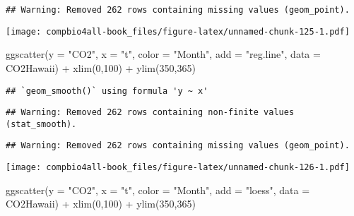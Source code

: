 \documentclass[
]{book}
\newenvironment{Shaded}{\begin{snugshade}}{\end{snugshade}}
\newcommand{\AttributeTok}[1]{\textcolor[rgb]{0.77,0.63,0.00}{#1}}
\newcommand{\DecValTok}[1]{\textcolor[rgb]{0.00,0.00,0.81}{#1}}
\newcommand{\FunctionTok}[1]{\textcolor[rgb]{0.00,0.00,0.00}{#1}}
\newcommand{\NormalTok}[1]{#1}
\newcommand{\SpecialCharTok}[1]{\textcolor[rgb]{0.00,0.00,0.00}{#1}}
\newcommand{\StringTok}[1]{\textcolor[rgb]{0.31,0.60,0.02}{#1}}
\begin{document}
\begin{verbatim}
## Warning: Removed 262 rows containing missing values (geom_point).
\end{verbatim}

\texttt{[image: compbio4all-book\_files/figure-latex/unnamed-chunk-125-1.pdf]}

\begin{Shaded}
\begin{Highlighting}[]
\FunctionTok{ggscatter}\NormalTok{(}\AttributeTok{y =} \StringTok{"CO2"}\NormalTok{,}
       \AttributeTok{x =} \StringTok{"t"}\NormalTok{,}
       \AttributeTok{color =} \StringTok{"Month"}\NormalTok{,}
       \AttributeTok{add =} \StringTok{"reg.line"}\NormalTok{,}
       \AttributeTok{data =}\NormalTok{ CO2Hawaii) }\SpecialCharTok{+}
  \FunctionTok{xlim}\NormalTok{(}\DecValTok{0}\NormalTok{,}\DecValTok{100}\NormalTok{) }\SpecialCharTok{+}
  \FunctionTok{ylim}\NormalTok{(}\DecValTok{350}\NormalTok{,}\DecValTok{365}\NormalTok{)}
\end{Highlighting}
\end{Shaded}

\begin{verbatim}
## `geom_smooth()` using formula 'y ~ x'
\end{verbatim}

\begin{verbatim}
## Warning: Removed 262 rows containing non-finite values (stat_smooth).
\end{verbatim}

\begin{verbatim}
## Warning: Removed 262 rows containing missing values (geom_point).
\end{verbatim}

\texttt{[image: compbio4all-book\_files/figure-latex/unnamed-chunk-126-1.pdf]}

\begin{Shaded}
\begin{Highlighting}[]
\FunctionTok{ggscatter}\NormalTok{(}\AttributeTok{y =} \StringTok{"CO2"}\NormalTok{,}
       \AttributeTok{x =} \StringTok{"t"}\NormalTok{,}
       \AttributeTok{color =} \StringTok{"Month"}\NormalTok{,}
       \AttributeTok{add =} \StringTok{"loess"}\NormalTok{,}
       \AttributeTok{data =}\NormalTok{ CO2Hawaii) }\SpecialCharTok{+}
  \FunctionTok{xlim}\NormalTok{(}\DecValTok{0}\NormalTok{,}\DecValTok{100}\NormalTok{) }\SpecialCharTok{+}
  \FunctionTok{ylim}\NormalTok{(}\DecValTok{350}\NormalTok{,}\DecValTok{365}\NormalTok{)}
\end{Highlighting}
\end{Shaded}
\end{document}
